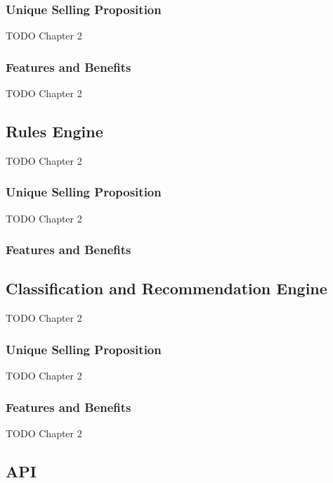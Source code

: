 \subsubsection*{Unique Selling Proposition}
TODO Chapter 2

\subsubsection*{Features and Benefits}
TODO Chapter 2


\subsection{Rules Engine}
TODO Chapter 2

\subsubsection*{Unique Selling Proposition}

TODO Chapter 2

\subsubsection*{Features and Benefits}


\subsection{Classification and Recommendation Engine}

TODO Chapter 2

\subsubsection*{Unique Selling Proposition}

TODO Chapter 2

\subsubsection*{Features and Benefits}

TODO Chapter 2


\subsection{API}

